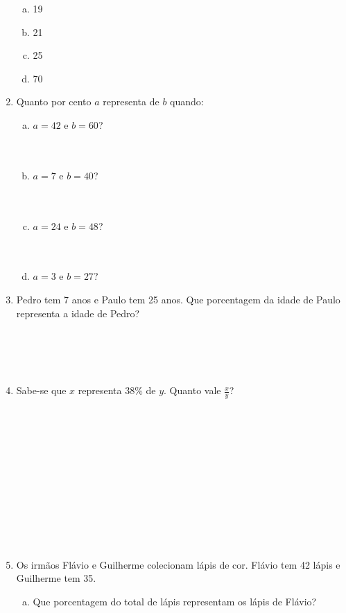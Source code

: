 \documentclass[a4paper,14pt]{article}
\begin{document}
\begin{multicols}{2}
\begin{enumerate}
\begin{enumerate}[a)]
				\item 19
				\item 21
				\item 25
				\item 70
			\end{enumerate}
			\item Quanto por cento $a$ representa de $b$ quando:
			\begin{enumerate}[a)]
				\item $a = 42$ e $b = 60$?
				\\\\\\
				\item $a = 7$ e $b = 40$?
				\\\\\\
				\item $a = 24$ e $b = 48$?
				\\\\\\
				\item $a = 3$ e $b = 27$?
			\end{enumerate}
			\item Pedro tem 7 anos e Paulo tem 25 anos. Que porcentagem da idade de Paulo representa a idade de Pedro? \\\\\\\\\\
			\item Sabe-se que $x$ representa 38\% de $y$. Quanto vale $\frac{x}{y}$? \\\\\\\\\\\\\\\\\\\\\\\\
			\item Os irmãos Flávio e Guilherme colecionam lápis de cor. Flávio tem 42 lápis e Guilherme tem 35.
			\begin{enumerate}[a)]
				\item Que porcentagem do total de lápis representam os lápis de Flávio? \\\\\\\\\\\\\\\\

\end{enumerate}
\end{enumerate}
\end{multicols}
\end{document}
